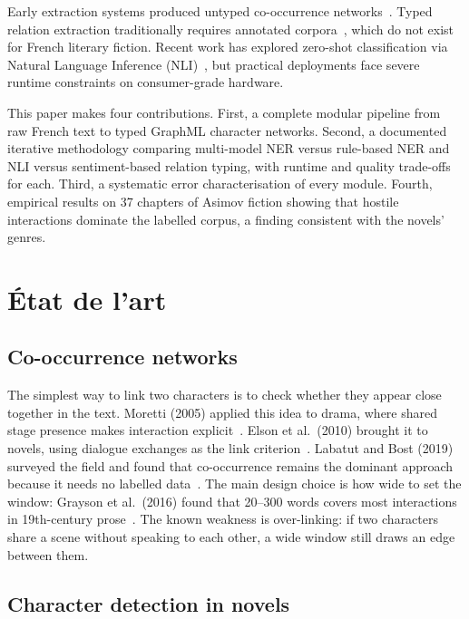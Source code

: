 \documentclass[a4paper]{article}
\begin{document}
Early extraction systems produced untyped co-occurrence networks~\cite{Elson2010}.
Typed relation extraction traditionally requires annotated corpora~\cite{Devlin2019},
which do not exist for French literary fiction. Recent work has explored
zero-shot classification via Natural Language Inference (NLI)~\cite{Yin2019,Laurer2022},
but practical deployments face severe runtime constraints on
consumer-grade hardware.

This paper makes four contributions. First, a complete modular pipeline from
raw French text to typed GraphML character networks. Second, a documented
iterative methodology comparing multi-model NER versus rule-based NER and
NLI versus sentiment-based relation typing, with runtime and quality
trade-offs for each. Third, a systematic error characterisation of every
module. Fourth, empirical results on 37 chapters of Asimov fiction showing
that hostile interactions dominate the labelled corpus, a finding
consistent with the novels' genres.

\section{État de l'art}

\subsection{Co-occurrence networks}

The simplest way to link two characters is to check whether they appear
close together in the text. Moretti (2005) applied this idea to drama,
where shared stage presence makes interaction explicit~\cite{Moretti2005}.
Elson et al.\ (2010) brought it to novels, using dialogue exchanges as
the link criterion~\cite{Elson2010}. Labatut and Bost (2019) surveyed the
field and found that co-occurrence remains the dominant approach because it
needs no labelled data~\cite{Labatut2019}. The main design choice is how
wide to set the window: Grayson et al.\ (2016) found that 20--300 words
covers most interactions in 19th-century prose~\cite{Grayson2016}.
The known weakness is over-linking: if two characters share a scene without
speaking to each other, a wide window still draws an edge between them.

\subsection{Character detection in novels}
\end{document}

